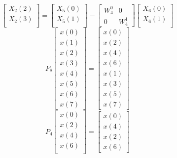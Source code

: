 \documentclass[journal,12pt,twocolumn]{IEEEtran}
\renewcommand\thesection{\arabic{section}}
\begin{document}
\begin{enumerate}[label=\thesection.\arabic*.,ref=\thesection.\theenumi]
\begin{equation}
\begin{bmatrix}
		X_{2}(2) \\ 
		X_{2}(3)\\ 
	\end{bmatrix}
	=
	\begin{bmatrix}
		X_{5}(0) \\ 
		X_{5}(1)\\ 
	\end{bmatrix}
	-
	\begin{bmatrix}
		W^{0}_{4} & 0\\
		0 & W^{1}_{4}
	\end{bmatrix}
	\begin{bmatrix}
		X_{6}(0) \\ 
		X_{6}(1) \\ 
	\end{bmatrix}
	\label{eq:4-2-low}
\end{equation}
\begin{equation}
	P_{8}
	\begin{bmatrix}
		x(0) \\ 
		x(1) \\ 
		x(2) \\ 
		x(3) \\ 
		x(4) \\ 
		x(5) \\
		x(6) \\
		x(7)
	\end{bmatrix}
	= 
	\begin{bmatrix}
		x(0) \\ 
		x(2) \\ 
		x(4) \\ 
		x(6) \\
		x(1) \\ 
		x(3) \\ 
		x(5) \\
		x(7)
	\end{bmatrix}
\end{equation}
\begin{equation}
	P_{4}
	\begin{bmatrix}
		x(0) \\ 
		x(2) \\ 
		x(4) \\ 
		x(6) \\
	\end{bmatrix}
	= 
	\begin{bmatrix}
		x(0) \\ 
		x(4) \\ 
		x(2) \\
		x(6)
	\end{bmatrix}
\end{equation}

\end{enumerate}
\end{document}
